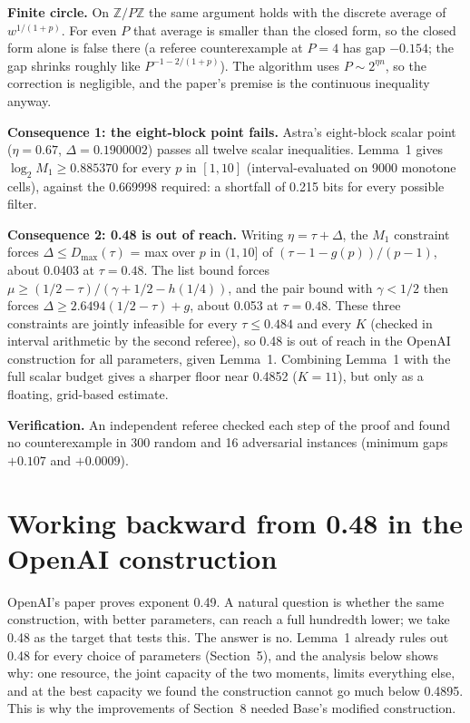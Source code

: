 \documentclass[11pt]{article}
\theoremstyle{plain}
\begin{document}
\textbf{Finite circle.} On $\mathbb{Z}/P\mathbb{Z}$ the same argument holds with the discrete average of $w^{1/(1+p)}$. For even $P$ that average is smaller than the closed form, so the closed form alone is false there (a referee counterexample at $P = 4$ has gap $-0.154$; the gap shrinks roughly like $P^{-1-2/(1+p)}$). The algorithm uses $P \sim 2^{\eta n}$, so the correction is negligible, and the paper's premise is the continuous inequality anyway.

\textbf{Consequence 1: the eight-block point fails.} Astra's eight-block scalar point ($\eta = 0.67$, $\Delta = 0.1900002$) passes all twelve scalar inequalities. Lemma~1 gives $\log_2 M_1 \ge 0.885370$ for every $p$ in $[1, 10]$ (interval-evaluated on 9000 monotone cells), against the 0.669998 required: a shortfall of 0.215 bits for every possible filter.

\textbf{Consequence 2: 0.48 is out of reach.} Writing $\eta = \tau + \Delta$, the $M_1$ constraint forces $\Delta \le D_{\max}(\tau)$ = max over $p$ in $(1, 10]$ of $(\tau - 1 - g(p))/(p - 1)$, about 0.0403 at $\tau = 0.48$. The list bound forces $\mu \ge (1/2 - \tau)/(\gamma + 1/2 - h(1/4))$, and the pair bound with $\gamma < 1/2$ then forces $\Delta \ge 2.6494(1/2 - \tau) + g$, about 0.053 at $\tau = 0.48$. These three constraints are jointly infeasible for every $\tau \le 0.484$ and every $K$ (checked in interval arithmetic by the second referee), so 0.48 is out of reach in the OpenAI construction for all parameters, given Lemma~1. Combining Lemma~1 with the full scalar budget gives a sharper floor near 0.4852 ($K = 11$), but only as a floating, grid-based estimate.

\textbf{Verification.} An independent referee checked each step of the proof and found no counterexample in 300 random and 16 adversarial instances (minimum gaps $+0.107$ and $+0.0009$).

\section{Working backward from 0.48 in the OpenAI construction}

OpenAI's paper proves exponent 0.49. A natural question is whether the same construction, with better parameters, can reach a full hundredth lower; we take 0.48 as the target that tests this. The answer is no. Lemma~1 already rules out 0.48 for every choice of parameters (Section~5), and the analysis below shows why: one resource, the joint capacity of the two moments, limits everything else, and at the best capacity we found the construction cannot go much below 0.4895. This is why the improvements of Section~8 needed Base's modified construction.
\end{document}
